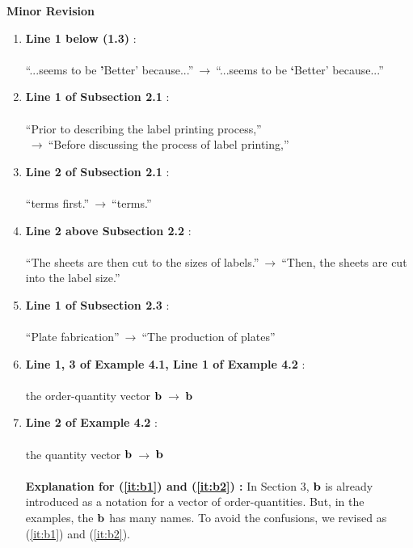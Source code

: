 \documentclass[10pt]{amsart}
\begin{document}
\newpage
\vspace{.5cm}
\begin{center}
	{\Large\bf Minor Revision}
\end{center}
\begin{enumerate}

\item {\bf Line 1 below (1.3)} :\\
~\\
``...seems to be {\bf\color{red}'}Better' because...''$~\longrightarrow~$``...seems to be {\bf\color{red} `}Better' because...''\\

\item {\bf Line 1 of Subsection 2.1} :\\
~\\
``Prior to describing the label printing process,''\\$~\longrightarrow~$``Before discussing the process of label printing,''\\

\item {\bf Line 2 of Subsection 2.1} :\\
~\\
``terms first.''$~\longrightarrow~$``terms.''\\

\item {\bf Line 2 above Subsection 2.2} :\\
~\\
``The sheets are then cut to the sizes of labels.''$~\longrightarrow~$``Then, the sheets are cut into the label size.''\\

\item {\bf Line 1 of Subsection 2.3} :\\
~\\
``Plate fabrication''$~\longrightarrow~$``The production of plates''\\

\item \label{it:b1}{\bf Line 1, 3 of Example 4.1, Line 1 of Example 4.2} :\\
~\\
the order-quantity vector ${\bf b}$$~\longrightarrow~$${\bf b}$\\

\item \label{it:b2}{\bf Line 2 of Example 4.2} :\\
~\\
the quantity vector ${\bf b}$$~\longrightarrow~$${\bf b}$\\
~\\
{\bf Explanation for (\ref{it:b1}) and (\ref{it:b2}) :} In Section 3, ${\bf b}$ is already introduced as a notation for a vector of order-quantities.
But, in the examples, the ${\bf b}$ has many names.
To avoid the confusions, we revised as (\ref{it:b1}) and (\ref{it:b2}).

\end{enumerate}
\end{document}

